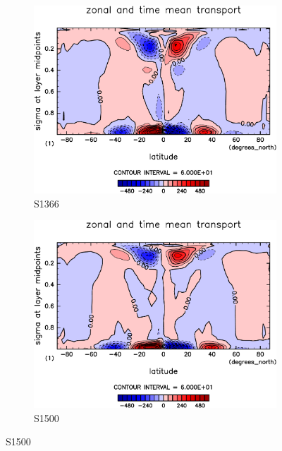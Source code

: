 \documentclass[body]{subfiles}
\begin{document}
\begin{figure}[t]
	\centering
	\begin{subfigure}{.4\textwidth}
		\centering
		\includegraphics[width=\textwidth]{S1366/MeriHeatTransTest@dryStatEn_M,time=14600:14965-crop-rotate.pdf}
		\caption{S1366}\label{乾燥静的エネルギー平均子午面循環S1366}
	\end{subfigure}
	\begin{subfigure}{.4\textwidth}
		\centering
		\includegraphics[width=\textwidth]{S1500/MeriHeatTransTest@dryStatEn_M,time=3650:4015-crop-rotate.pdf}
		\caption{S1500}\label{乾燥静的エネルギー平均子午面循環S1500}
	\end{subfigure}

\end{figure}
\end{document}
